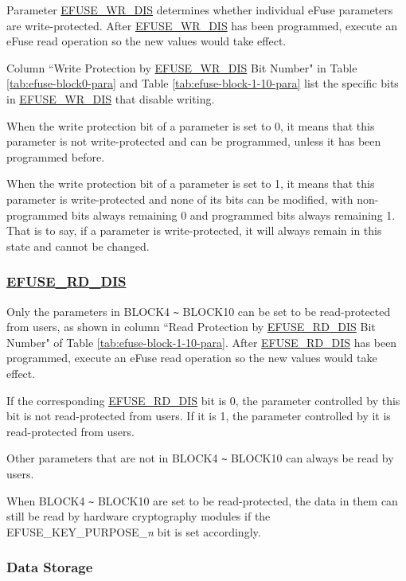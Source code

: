\documentclass[main\_\_EN.tex]{subfiles}
\begin{document}
Parameter \hyperref[fielddesc:EFUSEWRDIS]{EFUSE\_WR\_DIS} determines whether individual eFuse parameters are write-protected. After \hyperref[fielddesc:EFUSEWRDIS]{EFUSE\_WR\_DIS} has been programmed, execute an eFuse read operation so the new values would take effect.

Column ``Write Protection by \hyperref[fielddesc:EFUSEWRDIS]{EFUSE\_WR\_DIS} Bit Number" in Table  \ref{tab:efuse-block0-para} and Table \ref{tab:efuse-block-1-10-para} list the specific bits in \hyperref[fielddesc:EFUSEWRDIS]{EFUSE\_WR\_DIS} that disable writing.

When the write protection bit of a parameter is set to 0, it means that this parameter is not write-protected and can be programmed, unless it has been programmed before.

When the write protection bit of a parameter is set to 1, it means that this parameter is write-protected and none of its bits can be modified, with non-programmed bits always remaining 0 and programmed bits always remaining 1. That is to say, if a parameter is write-protected, it will always remain in this state and cannot be changed.

\subsubsection{\hyperref[fielddesc:EFUSERDDIS]{EFUSE\_RD\_DIS}}
\label{sec:efuse-rd-dis}

Only the parameters in BLOCK4 \verb+~+ BLOCK10 can be set to be read-protected from users, as shown in column ``Read Protection by \hyperref[fielddesc:EFUSERDDIS]{EFUSE\_RD\_DIS} Bit Number" of Table \ref{tab:efuse-block-1-10-para}. After \hyperref[fielddesc:EFUSERDDIS]{EFUSE\_RD\_DIS} has been programmed, execute an eFuse read operation so the new values would take effect.

If the corresponding \hyperref[fielddesc:EFUSERDDIS]{EFUSE\_RD\_DIS} bit is 0, the parameter controlled by this bit is not read-protected from users. If it is 1, the parameter controlled by it is read-protected from users.

Other parameters that are not in BLOCK4 \verb+~+ BLOCK10 can always be read by users.

When BLOCK4 \verb+~+ BLOCK10 are set to be read-protected, the data in them can still be read by hardware cryptography modules if the EFUSE\_KEY\_PURPOSE\_\textcolor{myred}{\it{n}} bit is set accordingly.

\subsubsection{Data Storage}
\label{sec:efuse-data-storage}
\end{document}
